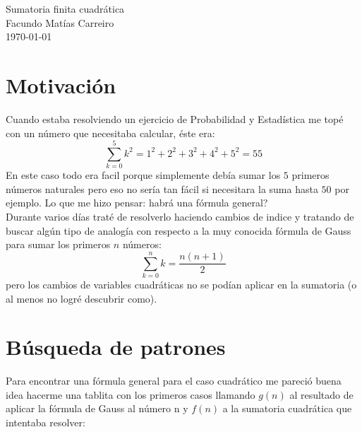 \documentclass[a4paper,10pt]{article}
\begin{document}
\begin{center}
Sumatoria finita cuadr\'atica \\
Facundo Mat\'ias Carreiro \\
\today
\end{center}

\section{Motivaci\'on}
Cuando estaba resolviendo un ejercicio de Probabilidad y Estad\'istica me
top\'e con un n\'umero que necesitaba calcular, \'este era:
\begin{displaymath}
\sum_{k=0}^{5} k^2 = 1^2 + 2^2 + 3^2 + 4^2 + 5^2 = 55
\end{displaymath}
En este caso todo era facil porque simplemente deb\'ia sumar los $5$ primeros
n\'umeros naturales pero eso no ser\'ia tan f\'acil si necesitara la suma
hasta $50$ por ejemplo. Lo que me hizo pensar: habr\'a una f\'ormula general? \\
Durante varios d\'ias trat\'e de resolverlo haciendo cambios de indice y
tratando de buscar alg\'un tipo de analog\'ia con respecto a la muy conocida
f\'ormula de Gauss para sumar los primeros $n$ n\'umeros:
\begin{equation}
\sum_{k=0}^{n} k = \frac{n(n+1)}{2}
\end{equation}
pero los cambios de variables cuadr\'aticas no se pod\'ian aplicar en la
sumatoria (o al menos no logr\'e descubrir como).

\section{B\'usqueda de patrones}
Para encontrar una f\'ormula general para el caso cuadr\'atico me pareci\'o
buena idea hacerme una tablita con los primeros casos llamando $g(n)$ al
resultado de aplicar la f\'ormula de Gauss al n\'umero n y $f(n)$ a la
sumatoria cuadr\'atica que intentaba resolver:
\end{document}
